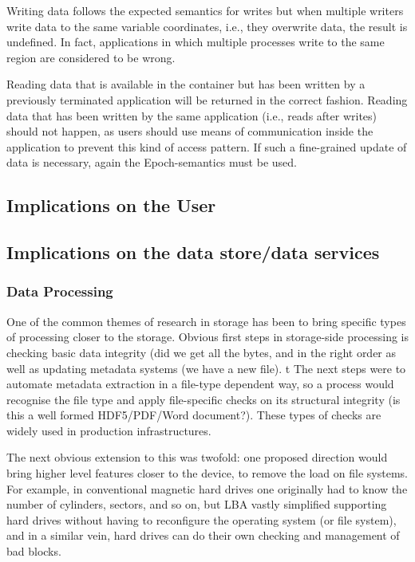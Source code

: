 Writing data follows the expected semantics for writes but when multiple writers write data to the same variable coordinates, i.e., they overwrite data, the result is undefined.
In fact, applications in which multiple processes write to the same region are considered to be wrong.

Reading data that is available in the container but has been written by a previously terminated application will be returned in the correct fashion.
Reading data that has been written by the same application (i.e., reads after writes) should not happen, as users should use means of communication inside the application to prevent this kind of access pattern.
If such a fine-grained update of data is necessary, again the Epoch-semantics must be used.




\subsection{Implications on the User}



\subsection{Implications on the data store/data services}

\subsubsection{Data Processing}

One of the common themes of research in storage has been to bring specific types
of processing closer to the storage. Obvious first steps in storage-side
processing is checking basic data integrity (did we get all the bytes, and in
the right order as well as updating metadata systems (we have a new file).
t The next steps were to automate metadata extraction in a file-type
dependent way, so a process would recognise the file type and apply
file-specific checks on its structural integrity (is this a well formed
HDF5/PDF/Word document?).  These types of checks are widely used in production
infrastructures.

The next obvious extension to this was twofold: one proposed direction would
bring higher level features closer to the device, to remove the load on
file systems.  For example, in conventional magnetic hard drives one originally
had to know the number of cylinders, sectors, and so on, but LBA vastly
simplified supporting hard drives without having to reconfigure the operating
system (or file system), and in a similar vein, hard drives can do their own
checking and management of bad blocks.

